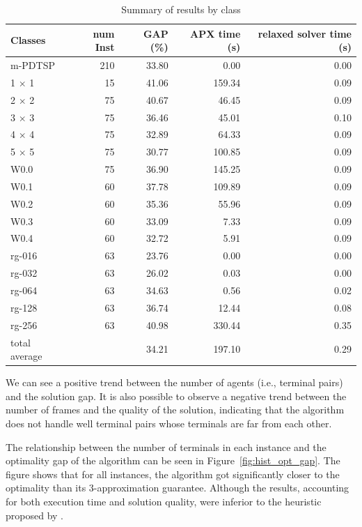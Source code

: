\begin{table}[H]
\caption{Summary of results by class}
\centering
    \begin{tabular}{lrrrr}
        \toprule
        Classes & num Inst & GAP (\%) & APX time (s) & relaxed solver time (s) \\
        \midrule
        m-PDTSP & 210 & 33.80 & 0.00 & 0.00 \\
        \hline
        1 $\times$ 1 & 15 & 41.06 & 159.34 & 0.09 \\
        2 $\times$ 2 & 75 & 40.67 & 46.45 & 0.09 \\
        3 $\times$ 3 & 75 & 36.46 & 45.01 & 0.10 \\
        4 $\times$ 4 & 75 & 32.89 & 64.33 & 0.09 \\
        5 $\times$ 5 & 75 & 30.77 & 100.85 & 0.09 \\
        \hline
        W0.0 & 75 & 36.90 & 145.25 & 0.09 \\
        W0.1 & 60 & 37.78 & 109.89 & 0.09 \\
        W0.2 & 60 & 35.36 & 55.96 & 0.09 \\
        W0.3 & 60 & 33.09 & 7.33 & 0.09 \\
        W0.4 & 60 & 32.72 & 5.91 & 0.09 \\
        \hline
        rg-016 & 63 & 23.76 & 0.00 & 0.00 \\
        rg-032 & 63 & 26.02 & 0.03 & 0.00 \\
        rg-064 & 63 & 34.63 & 0.56 & 0.02 \\
        rg-128 & 63 & 36.74 & 12.44 & 0.08 \\
        rg-256 & 63 & 40.98 & 330.44 & 0.35 \\
        \hline
        total average & & 34.21 & 197.10  & 0.29 \\
        \bottomrule
    \end{tabular}
\label{table_avg_apx}
\end{table}


We can see a positive trend between the number of agents (i.e., terminal pairs) and the solution gap. It is also possible to observe a negative trend between the number of frames and the quality of the solution, indicating that the algorithm does not handle well terminal pairs whose terminals are far from each other.

The relationship between the number of terminals in each instance and the optimality gap of the algorithm can be seen in Figure~\ref{fig:hist_opt_gap}. The figure shows that for all instances, the algorithm got significantly closer to the optimality than its 3-approximation guarantee. Although the results, accounting for both execution time and solution quality, were inferior to the heuristic proposed by \cite{Pereira2018TheSM}. 

